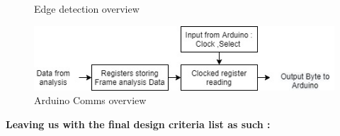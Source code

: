 \documentclass[10pt,twoside]{article}
\begin{document}
\begin{figure}[!htb]
\begin{minipage}{0.33\textwidth}
        \caption{Edge detection overview}
        \label{fig:EdgeDetectionOverview}
    \end{minipage}%
    \begin{minipage}{.33\textwidth}
        \centering
        \includegraphics[width=1\linewidth, height=0.08\textheight]{ArduinoComms.jpg}
        \caption{Arduino Comms overview}
        \label{fig:ArduinoComms}
    \end{minipage}%
\end{figure}


\newpage


\textbf{Leaving us with the final design criteria list as such :}
\end{document}
